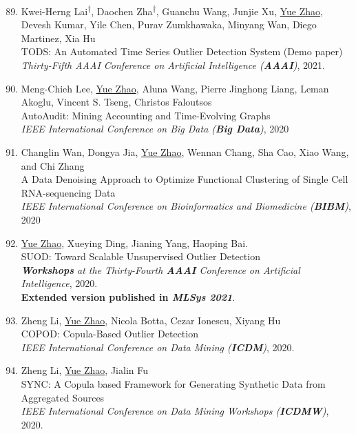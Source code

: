 \documentclass[margin,line,pifont,palatino,courier]{res}
\newcommand{\equalcontrib}{\textsuperscript{$\dagger$}}
\newenvironment{benumerate}[1]{
    \let\oldItem\item
    \def\item{\addtocounter{enumi}{-2}\oldItem}
    \begin{enumerate}[leftmargin=0.25in,label=\textcolor{uscred}{\arabic*.}]
    \setcounter{enumi}{#1}
    \addtocounter{enumi}{1}
}{
    \end{enumerate}
}
\begin{document}
\begin{resume}
\begin{benumerate}{88}
    \item Kwei-Herng Lai\equalcontrib, Daochen Zha\equalcontrib, Guanchu Wang, Junjie Xu, \underline{Yue Zhao}, Devesh Kumar, Yile Chen, Purav Zumkhawaka, Minyang Wan, Diego Martinez, Xia Hu \\
    TODS: An Automated Time Series Outlier Detection System (Demo paper) \\
    \textit{Thirty-Fifth AAAI Conference on Artificial Intelligence (\textbf{AAAI})}, 2021. 

    
    \item Meng-Chieh Lee, \underline{Yue Zhao}, Aluna Wang, Pierre Jinghong Liang, Leman Akoglu, Vincent S. Tseng, Christos Faloutsos \\
    AutoAudit: Mining Accounting and Time-Evolving Graphs\\ 
    \textit{IEEE International Conference on Big Data (\textbf{Big Data})}, 2020

    \item Changlin Wan, Dongya Jia, \underline{Yue Zhao}, Wennan Chang, Sha Cao, Xiao Wang, and Chi Zhang \\
    A Data Denoising Approach to Optimize Functional Clustering of Single Cell RNA-sequencing Data\\ 
    \textit{IEEE International Conference on Bioinformatics and Biomedicine (\textbf{BIBM})}, 2020

    \item \underline{Yue Zhao}, Xueying Ding, Jianing Yang, Haoping Bai. \\
    SUOD: Toward Scalable Unsupervised Outlier Detection \\
    \textit{\textbf{Workshops} at the Thirty-Fourth \textbf{AAAI} Conference on Artificial Intelligence}, 2020.\\
    \textbf{Extended version published in \textit{MLSys 2021}}.

    \item Zheng Li, \underline{Yue Zhao}, Nicola Botta, Cezar Ionescu, Xiyang Hu\\
    COPOD: Copula-Based Outlier Detection\\
    \textit{IEEE International Conference on Data Mining (\textbf{ICDM})}, 2020.
    
    \item Zheng Li, \underline{Yue Zhao}, Jialin Fu\\
    SYNC: A Copula based Framework for Generating Synthetic Data from Aggregated Sources\\
    \textit{IEEE International Conference on Data Mining Workshops (\textbf{ICDMW})}, 2020.


\end{benumerate}
\end{resume}
\end{document}
